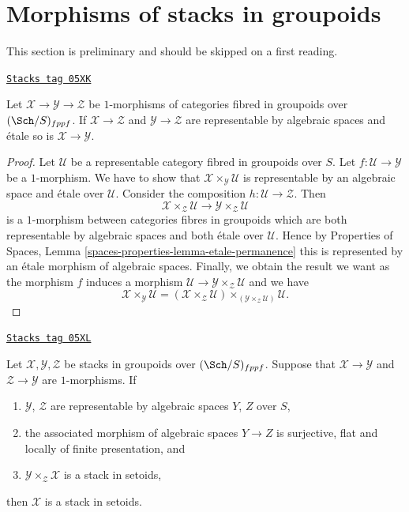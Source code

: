 \section{Morphisms of stacks in groupoids}
\label{criteria-section-1-morphisms}
This section is preliminary and should be skipped on a first reading.

\begin{lemma}
\label{criteria-lemma-etale-permanence}
\href{https://stacks.math.columbia.edu/tag/05XK}{\texttt{Stacks tag 05XK}}

Let $\mathcal{X} \to \mathcal{Y} \to \mathcal{Z}$
be $1$-morphisms of categories fibred in groupoids over
$(\Sch/S)_{fppf}$.
If $\mathcal{X} \to \mathcal{Z}$ and $\mathcal{Y} \to \mathcal{Z}$ are
representable by algebraic spaces and \'etale so is
$\mathcal{X} \to \mathcal{Y}$.
\end{lemma}

\begin{proof}
Let $\mathcal{U}$ be a representable category fibred in groupoids over $S$.
Let $f : \mathcal{U} \to \mathcal{Y}$ be a $1$-morphism. We have to show that
$\mathcal{X} \times_\mathcal{Y} \mathcal{U}$ is representable by an
algebraic space and \'etale over $\mathcal{U}$.
Consider the composition $h : \mathcal{U} \to \mathcal{Z}$. Then
$$
\mathcal{X} \times_\mathcal{Z} \mathcal{U}
\longrightarrow
\mathcal{Y} \times_\mathcal{Z} \mathcal{U}
$$
is a $1$-morphism between categories fibres in groupoids which are both
representable by algebraic spaces and both \'etale over $\mathcal{U}$.
Hence by
Properties of Spaces, Lemma \ref{spaces-properties-lemma-etale-permanence}
this is represented by an \'etale morphism of algebraic spaces.
Finally, we obtain the result we want as the morphism $f$ induces
a morphism $\mathcal{U} \to \mathcal{Y} \times_\mathcal{Z} \mathcal{U}$
and we have
$$
\mathcal{X} \times_\mathcal{Y} \mathcal{U} =
(\mathcal{X} \times_\mathcal{Z} \mathcal{U})
\times_{(\mathcal{Y} \times_\mathcal{Z} \mathcal{U})}
\mathcal{U}.
$$
\end{proof}

\begin{lemma}
\label{criteria-lemma-stack-in-setoids-descent}
\href{https://stacks.math.columbia.edu/tag/05XL}{\texttt{Stacks tag 05XL}}

Let $\mathcal{X}, \mathcal{Y}, \mathcal{Z}$ be stacks in groupoids
over $(\Sch/S)_{fppf}$. Suppose that $\mathcal{X} \to \mathcal{Y}$
and $\mathcal{Z} \to \mathcal{Y}$ are $1$-morphisms.
If
\begin{enumerate}
\item $\mathcal{Y}$, $\mathcal{Z}$ are representable by algebraic spaces
$Y$, $Z$ over $S$,
\item the associated morphism of algebraic spaces $Y \to Z$ is surjective,
flat and locally of finite presentation, and
\item $\mathcal{Y} \times_\mathcal{Z} \mathcal{X}$ is a stack in
setoids,
\end{enumerate}
then $\mathcal{X}$ is a stack in setoids.
\end{lemma}

